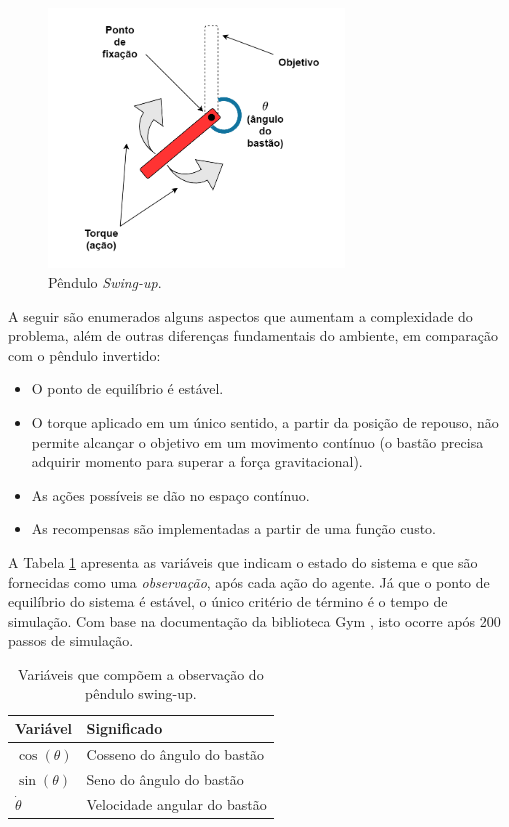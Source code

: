 \begin{figure}[H]
	\centering
	\includegraphics[width=0.7\textwidth]{02_desenvolvimento/04_EC_Fig_PendulumEnv2.png}
	\caption{Pêndulo \textit{Swing-up}.}
	\label{fig:4ec-pendulumenv}
\end{figure}

A seguir são enumerados alguns aspectos que aumentam a complexidade do problema, além de outras diferenças fundamentais do ambiente, em comparação com o pêndulo invertido:

\begin{itemize}[label=\raisebox{0.25ex}{\tiny$\bullet$}]
	\item O ponto de equilíbrio é estável.
	\item O torque aplicado em um único sentido, a partir da posição de repouso, não permite alcançar o objetivo em um movimento contínuo (o bastão precisa adquirir momento para superar a força gravitacional).
	\item As ações possíveis se dão no espaço contínuo.
	\item As recompensas são implementadas a partir de uma função custo.
\end{itemize}

A Tabela \ref{tab:4ec-pendulumvarestado} apresenta as variáveis que indicam o estado do sistema e que são fornecidas como uma \textit{observação}, após cada ação do agente. Já que o ponto de equilíbrio do sistema é estável, o único critério de término é o tempo de simulação. Com base na documentação da biblioteca Gym \cite{openaigym}, isto ocorre após 200 passos de simulação.

\begin{table}[H]
	\centering
	\caption{Variáveis que compõem a observação do pêndulo swing-up.}
	\label{tab:4ec-pendulumvarestado}
	\begin{tabular}{l|l} \toprule
		{Variável} & {Significado}\\ \midrule
		{$\cos(\theta)$} & {Cosseno do ângulo do bastão} \\
		{$\sin(\theta)$} & {Seno do ângulo do bastão} \\
		{$\dot{\theta}$} & {Velocidade angular do bastão} \\
		\bottomrule
	\end{tabular}
\end{table}

